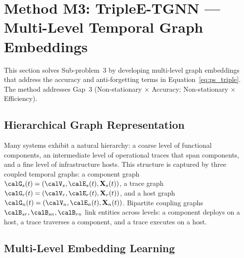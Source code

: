 \section{Method M3: TripleE-TGNN --- Multi-Level Temporal Graph Embeddings}
\label{sec:triple_e}

This section solves Sub-problem~3 by developing multi-level graph embeddings that address the accuracy and anti-forgetting terms in Equation~\eqref{eq:ps_triple}. The method addresses Gap~3 (Non-stationary $\times$ Accuracy; Non-stationary $\times$ Efficiency).

\subsection{Hierarchical Graph Representation}

Many systems exhibit a natural hierarchy: a coarse level of functional components, an intermediate level of operational traces that span components, and a fine level of infrastructure hosts. This structure is captured by three coupled temporal graphs: a component graph $\calG_s(t)=(\calV_s,\calE_s(t),\mathbf{X}_s(t))$, a trace graph $\calG_r(t)=(\calV_r,\calE_r(t),\mathbf{X}_r(t))$, and a host graph $\calG_n(t)=(\calV_n,\calE_n(t),\mathbf{X}_n(t))$. Bipartite coupling graphs $\calB_{sr},\calB_{sn},\calB_{rn}$ link entities across levels: a component deploys on a host, a trace traverses a component, and a trace executes on a host.

\subsection{Multi-Level Embedding Learning}

